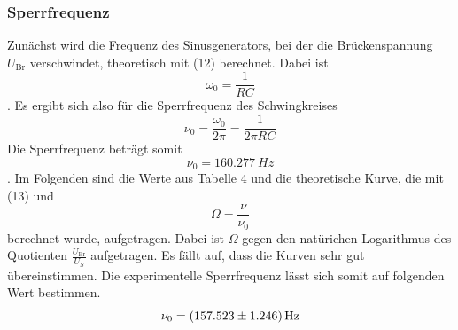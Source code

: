 \subsubsection{Sperrfrequenz}
Zunächst wird die Frequenz des Sinusgenerators, bei der die Brückenspannung $U_\text{Br}$ verschwindet, theoretisch mit (12) berechnet.
Dabei ist
\begin{equation*}
    \omega_0 = \frac{1}{RC}
\end{equation*}.
Es ergibt sich also für die Sperrfrequenz des Schwingkreises
\begin{equation}
    \nu_0 = \frac{\omega_0}{2\pi} = \frac{1}{2\pi RC}
\end{equation}
Die Sperrfrequenz beträgt somit
\begin{equation*}
    \nu_0 = \SI{160,277}{Hz}
\end{equation*}.
Im Folgenden sind die Werte aus Tabelle 4 und die theoretische Kurve, die mit (13) und
\begin{equation*}
    \Omega = \frac{\nu}{\nu_0}
\end{equation*} berechnet wurde, aufgetragen.
Dabei ist $\Omega$ gegen den natürichen Logarithmus des Quotienten $\frac{U_\text{Br}}{U_S}$ aufgetragen.
Es fällt auf, dass die Kurven sehr gut übereinstimmen.
Die experimentelle Sperrfrequenz lässt sich somit auf folgenden Wert bestimmen.
\begin{equation}
    \nu_0 = \SI{157,523 \pm 1,246}{Hz} \notag
\end{equation}

